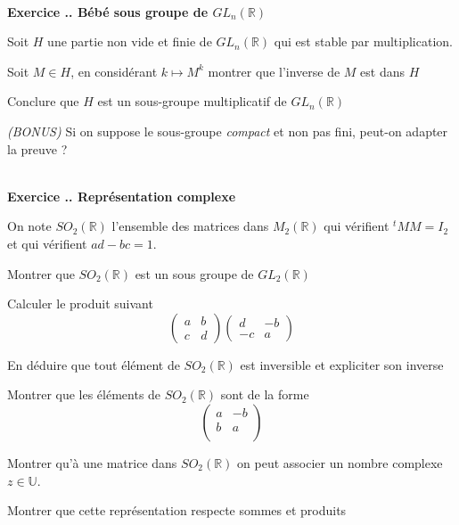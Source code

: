 \documentclass{article}
\newcommand{\mb}[1]{\mathbb{#1}}
\newcounter{exo}
\newcommand{\exercice}[1][\null]{\textbf{\\ Exercice \thesection.\theexo. #1} \addtocounter{exo}{1}}
\begin{document}
\exercice[Bébé sous groupe de $GL_n(\mathbb{R})$]
Soit $H$ une partie non vide et finie de $GL_n(\mb{R})$
qui est stable par multiplication.

\begin{compactenum}[(i)]
\item Soit $M \in H$, en considérant $k \mapsto M^k$ 
    montrer que l'inverse de $M$ est dans $H$
\item Conclure que $H$ est un sous-groupe multiplicatif de $GL_n(\mb{R})$
\item \emph{(BONUS)} Si on suppose le sous-groupe \emph{compact} et non pas 
    fini, peut-on adapter la preuve ?
\end{compactenum}

\exercice[Représentation complexe]

On note $SO_2(\mb{R})$ l'ensemble des matrices dans $M_2(\mb{R})$
qui vérifient ${}^t M M = I_2$ et qui vérifient $ad - bc = 1$.

\begin{compactenum}[(i)]
\item Montrer que $SO_2(\mb{R})$ est un sous groupe de $GL_2(\mb{R})$
\item Calculer le produit suivant 
    \begin{equation*}
        \begin{pmatrix}
            a & b \\
            c & d 
        \end{pmatrix}
        \begin{pmatrix}
            d  & -b \\
            -c & a 
        \end{pmatrix}
    \end{equation*}
\item En déduire que tout élément de $SO_2(\mb{R})$ est inversible 
    et expliciter son inverse 
\item Montrer que les éléments de $SO_2(\mb{R})$ sont de la forme 
    \begin{equation*}
        \begin{pmatrix}
            a & -b \\
            b & a \\
        \end{pmatrix}
    \end{equation*}
\item Montrer qu'à une matrice dans $SO_2(\mb{R})$ on peut 
associer un nombre complexe $z \in \mb{U}$. 
\item Montrer que cette représentation respecte sommes 
    et produits
\end{compactenum}
\end{document}

